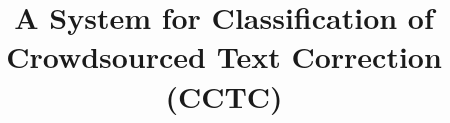\documentclass{sig-alternate}
\begin{document}
%

\title{ A System for Classification of Crowdsourced Text Correction (CCTC)}

%
%
%
%
%
\end{document}
